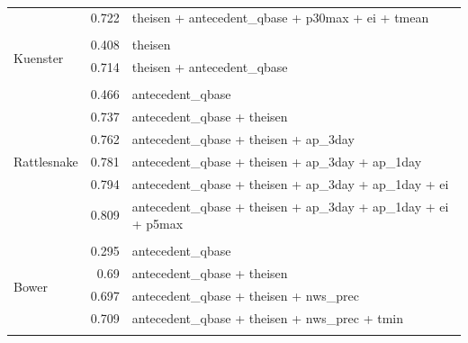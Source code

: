 \documentclass[10pt]{article}
\begin{document}
\begin{table}[h]
\begin{center}
\begin{tabular}{lrl}
 & 0.722 & theisen + antecedent\_qbase + p30max + ei + tmean\\ 
\vspace{2mm}\\ \multirow{3}{*}{Kuenster} & 0.408 & theisen\\ 
 & 0.714 & theisen + antecedent\_qbase\\ 
\vspace{2mm}\\ \multirow{7}{*}{Rattlesnake} & 0.466 & antecedent\_qbase\\ 
 & 0.737 & antecedent\_qbase + theisen\\ 
 & 0.762 & antecedent\_qbase + theisen + ap\_3day\\ 
 & 0.781 & antecedent\_qbase + theisen + ap\_3day + ap\_1day\\ 
 & 0.794 & antecedent\_qbase + theisen + ap\_3day + ap\_1day + ei\\ 
 & 0.809 & antecedent\_qbase + theisen + ap\_3day + ap\_1day + ei + p5max\\ 
\vspace{2mm}\\ \multirow{5}{*}{Bower} & 0.295 & antecedent\_qbase\\ 
 & 0.69 & antecedent\_qbase + theisen\\ 
 & 0.697 & antecedent\_qbase + theisen + nws\_prec\\ 
 & 0.709 & antecedent\_qbase + theisen + nws\_prec + tmin\\ 
\vspace{2mm}\\     \end{tabular}
    \caption{\label{sed_r_square_nosnow}}
    \end{center}
\end{table}
\end{document}
